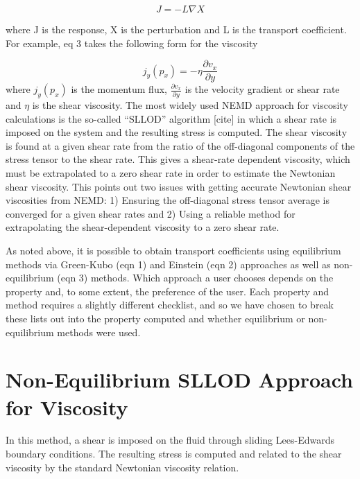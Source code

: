 \documentclass[9pt]{livecoms}
\begin{document}
\begin{equation}
J = -L \nabla X
\end{equation}

where J is the response, X is the perturbation and L is the transport coefficient. For example, eq 3 takes the following form for the viscosity

\begin{equation}
j_y(p_x) = -\eta \frac{\partial v_x}{\partial y}
\end{equation}
where $j_y(p_x)$ is the momentum flux, $\frac{\partial v_x}{\partial y}$ is the velocity gradient or shear rate and $\eta$ is the shear viscosity.  The most widely used NEMD approach for viscosity calculations is the so-called “SLLOD” algorithm [cite] in which a shear rate is imposed on the system and the resulting stress is computed. The shear viscosity is found at a given shear rate from the ratio of the off-diagonal components of the stress tensor to the shear rate. This gives a shear-rate dependent viscosity, which must be extrapolated to a zero shear rate in order to estimate the Newtonian shear viscosity. This points out two issues with getting accurate Newtonian shear viscosities from NEMD: 1) Ensuring the off-diagonal stress tensor average is converged for a given shear rates and 2) Using a reliable method for extrapolating the shear-dependent viscosity to a zero shear rate. 

As noted above, it is possible to obtain transport coefficients using equilibrium methods via Green-Kubo (eqn 1) and Einstein (eqn 2) approaches as well as non-equilibrium (eqn 3) methods. Which approach a user chooses depends on the property and, to some extent, the preference of the user. Each property and method requires a slightly different checklist, and so we have chosen to break these lists out into the property computed and whether equilibrium or non-equilibrium methods were used.

\section{Non-Equilibrium SLLOD Approach for Viscosity}

In this method, a shear is imposed on the fluid through sliding Lees-Edwards boundary conditions. The resulting stress is computed and related to the shear viscosity by the standard Newtonian viscosity relation.
\end{document}
